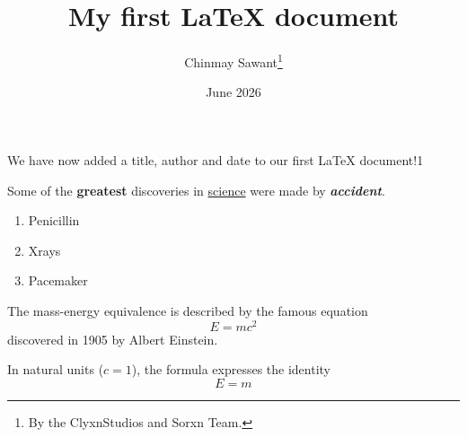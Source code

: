\documentclass[12pt, letterpaper]{article}
\title{My first LaTeX document}
\author{Chinmay Sawant\thanks{By the ClyxnStudios and Sorxn Team.}}
\date{June 2026}
\begin{document}
	\maketitle
	We have now added a title, author and date to our first \LaTeX{} document!1
	
	Some of the \textbf{greatest}
	discoveries in \underline{science} 
	were made by \textbf{\textit{accident}}.
	
	\begin{enumerate}
		\item Penicillin
		\item Xrays
		\item Pacemaker
	\end{enumerate}
	
	The mass-energy equivalence is described by the famous equation
	\[ E=mc^2 \] discovered in 1905 by Albert Einstein. 
	
	In natural units ($c = 1$), the formula expresses the identity
	\begin{equation}
		E=m
	\end{equation}
	
\end{document}
